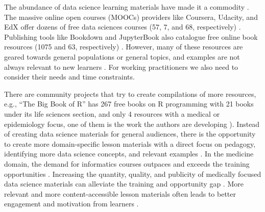 \documentclass[020-persona\_validation.tex]{subfiles}
\begin{document}
    The abundance of data science learning materials have made it a commodity
    \cite{krossDemocratizationDataScience2020}.
    The massive online open courses (MOOCs) providers like
    Coursera,
    Udacity, and
    EdX
    offer dozens of free data sciences courses
    (57, 7, and 68, respectively)
    \cite{courseraTopFreeCourses, udacityDataScienceOnline, edxDataAnalysisCourses}.
    Publishing tools like Bookdown and
    JupyterBook
    also catalogue free online book resources
    (1075 and 63, respectively)
    \cite{bookdownAllBooksBookdown, executablebookprojectGalleryJupyterBooks}.
    However, many of these resources are geared towards general populations or general topics,
    and examples are not always relevant to new learners
    \cite{krossDemocratizationDataScience2020}.
    For working practitioners we also need to consider their needs and time constraints.

    There are community projects that try to create compilations of more resources,
    e.g., ``The Big Book of R'' has 267 free books on R programming with
    21 books under its life sciences section, and
    only 4 resources with a medical or epidemiology focus,
    one of them is the work the authors are developing \cite{baruffaBigBook2021}).
    Instead of creating data science materials for general audiences,
    there is the opportunity to create more domain-specific lesson materials
    with a direct focus on pedagogy,
    identifying more data science concepts,
    and relevant examples
    \cite{krossDemocratizationDataScience2020}.
    In the medicine domain, the demand for informatics courses outpaces and exceeds the training opportunities
    \cite{banerjeeMedicalStudentAwareness2015, americanmedicalassociationStudentInterestInformatics, americanmedicalassociationAcceleratingChangeMedical2021, americanmedicalassociationEducation}.
    Increasing the quantity, quality, and publicity of medically focused
    data science materials can alleviate the training and opportunity gap
    \cite{banerjeeMedicalStudentAwareness2015, americanmedicalassociationAcceleratingChangeMedical2021}.
    More relevant and more content-accessible lesson materials often leads to better engagement and motivation from learners
    \cite{wilson2019teaching, ambrose2010learning, Koch2016}.


\end{document}
